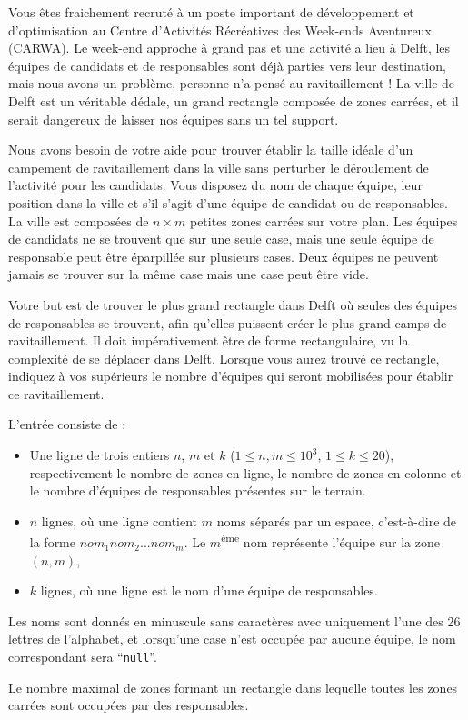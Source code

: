 \problemname{\problemyamlname}

Vous êtes fraichement recruté à un poste important de développement et
d'optimisation au Centre d'Activités Récréatives des Week-ends
Aventureux (CARWA). Le week-end approche à grand pas et une activité a lieu à Delft,
les équipes de candidats et de responsables sont déjà parties vers leur destination,
mais nous avons un problème, personne n'a pensé au ravitaillement !
La ville de Delft est un véritable dédale, un grand rectangle composée de zones carrées,
et il serait dangereux de laisser nos équipes sans un tel support.

Nous avons besoin de votre aide pour trouver établir la taille idéale d'un
campement de ravitaillement dans la ville sans perturber le déroulement de l'activité pour les candidats.
Vous disposez du nom de chaque équipe, leur position dans la ville et s'il s'agit d'une
équipe de candidat ou de responsables. La ville est composées de $n \times m$ petites zones carrées sur votre plan.
Les équipes de candidats ne se trouvent que sur une seule case, mais une seule équipe de responsable peut être éparpillée sur plusieurs cases.
Deux équipes ne peuvent jamais se trouver sur la même case mais une case peut être vide.

Votre but est de trouver le plus grand rectangle dans Delft où
seules des équipes de responsables se trouvent, afin qu'elles puissent créer le plus
grand camps de ravitaillement. Il doit impérativement être de forme rectangulaire, vu la complexité de se déplacer dans Delft.
Lorsque vous aurez trouvé ce rectangle, indiquez à vos supérieurs le nombre d'équipes qui seront mobilisées pour établir ce ravitaillement.

\begin{Input}
	L'entrée consiste de :
	\begin{itemize}
		\item Une ligne de trois entiers $n$, $m$ et $k$ ($1 \le n,m \le 10^3$, $1 \le k \le 20$),
respectivement le nombre de zones en ligne, le nombre de zones en colonne et le nombre d'équipes de responsables présentes sur le terrain.
		\item $n$ lignes, où une ligne contient $m$ noms séparés par un espace, c'est-à-dire de la forme $nom_1 nom_2 ... nom_m$. Le $m$\textsuperscript{ème} nom représente l'équipe sur la zone $(n,m)$,
		\item $k$ lignes, où une ligne est le nom d'une équipe de responsables.
	\end{itemize}
	Les noms sont donnés en minuscule sans caractères avec uniquement l'une des 26 lettres de l'alphabet, et lorsqu'une case n'est occupée par aucune équipe, le nom correspondant sera ``\verb|null|''.
\end{Input}

\begin{Output}
	Le nombre maximal de zones formant un rectangle dans lequelle toutes les zones carrées sont occupées par des responsables.
\end{Output}
